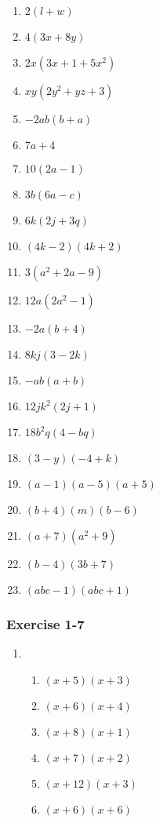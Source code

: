 {\begin{multicols}{3}
\begin{enumerate}[noitemsep, label=\textbf{\arabic*}. ] 
\item $2(l + w)$%
\item $4(3x + 8y)$%
\item $2x(3x + 1 +5x^2)$%
\item $xy(2y^2 + yz + 3)$%
\item $-2ab(b + a)$%
\item $7a + 4$%
\item $10(2a - 1)$%
\item $3b(6a - c)$%
\item $6k(2j + 3q)$%
\item $(4k - 2)(4k + 2)$%
\item $3(a^2 + 2a - 9)$%
\item $12a( 2a^2 -1)$%
\item $-2a(b + 4)$%
\item $8kj(3 - 2k)$%
\item $-ab(a + b)$%
\item $12jk^2(2j+1)$%
\item $18b^2q(4 - bq)$%
\item $(3 - y)(-4 + k)$%
\item $(a - 1)(a - 5)(a + 5)$%
\item $(b + 4)(m)(b - 6)$%
\item $(a + 7)(a^2 + 9)$ %
\item $(b - 4)(3b + 7)$%
\item $(abc - 1)(abc + 1)$%
\end{enumerate}

\subsubsection*{Exercise 1-7} %

\begin{enumerate}[noitemsep, label=\textbf{\arabic*}. ] 
\item %

\begin{enumerate}[noitemsep, label=\textbf{(\alph*)} ] 
\item $(x + 5)(x + 3)$%
\item $(x + 6)(x + 4)$%
\item $(x + 8)(x + 1)$%
\item $(x + 7)(x + 2)$%
\item $(x + 12)(x + 3)$%
\item $(x + 6)(x + 6)$%
\end{enumerate}




\end{enumerate}
\end{multicols}}
